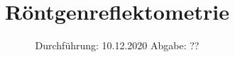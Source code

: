 

\subject{Nr. 44}
\title{Röntgenreflektometrie}
\date{%
  Durchführung: 10.12.2020
  \hspace{3em}
  Abgabe: ??
}



\maketitle
\thispagestyle{empty}
\tableofcontents
\newpage






\printbibliography{}


